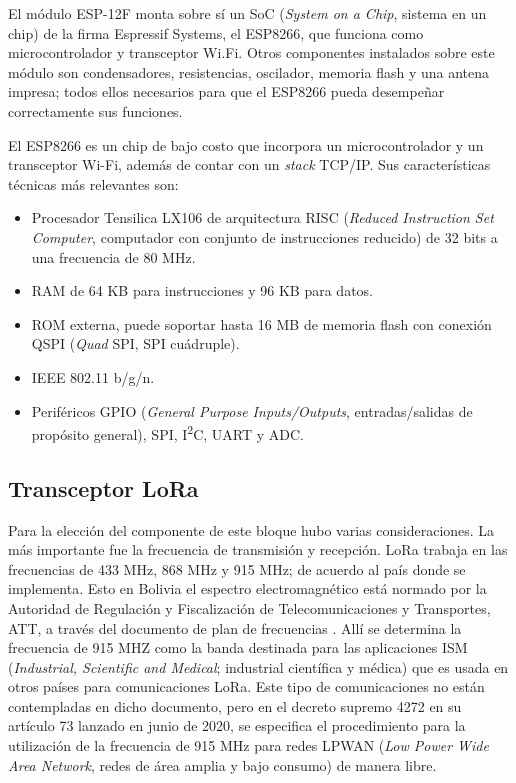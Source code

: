 
El módulo ESP-12F monta sobre sí un SoC (\textit{System on a Chip}, sistema en un chip) de la firma Espressif Systems, el ESP8266, que funciona como microcontrolador y transceptor Wi.Fi. Otros componentes instalados sobre este módulo son condensadores, resistencias, oscilador, memoria flash y una antena impresa; todos ellos necesarios para que el ESP8266 pueda desempeñar correctamente sus funciones.

El ESP8266 es un chip de bajo costo que incorpora un microcontrolador y un transceptor Wi-Fi, además de contar con un \textit{stack} TCP/IP. Sus características técnicas más relevantes son:
\begin{itemize}
	\item Procesador Tensilica LX106 de arquitectura RISC (\textit{Reduced Instruction Set Computer}, computador con conjunto de instrucciones reducido) de 32 bits a una frecuencia de 80 MHz.
	\item RAM de 64 KB para instrucciones y 96 KB para datos.
	\item ROM externa, puede soportar hasta 16 MB de memoria flash con conexión QSPI (\textit{Quad} SPI, SPI cuádruple).
	\item IEEE 802.11 b/g/n.
	\item Periféricos GPIO (\textit{General Purpose Inputs/Outputs}, entradas/salidas de propósito general), SPI, I\textsuperscript{2}C, UART y ADC.
\end{itemize}

\subsection{Transceptor LoRa}

Para la elección del componente de este bloque hubo varias consideraciones. La más importante fue la frecuencia de transmisión y recepción. LoRa trabaja en las frecuencias de 433 MHz, 868 MHz y 915 MHz; de acuerdo al país donde se implementa. Esto en Bolivia el espectro electromagnético está normado por la Autoridad de Regulación y Fiscalización de Telecomunicaciones y Transportes, ATT, a través del documento de plan de frecuencias \citep{WEBSITE:17}. Allí se determina la frecuencia de 915 MHZ como la banda destinada para las aplicaciones ISM (\textit{Industrial, Scientific and Medical}; industrial científica y médica) que es usada en otros países para comunicaciones LoRa. Este tipo de comunicaciones no están contempladas en dicho documento, pero en el decreto supremo 4272 en su artículo 73\citep{WEBSITE:27} lanzado en junio de 2020, se especifica el procedimiento para la utilización de la frecuencia de 915 MHz para redes LPWAN (\textit{Low Power Wide Area Network}, redes de área amplia y bajo consumo) de manera libre.

